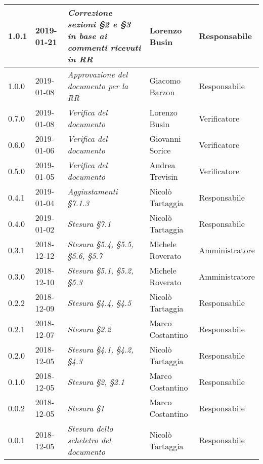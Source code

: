 \begin{longtable}{C{2cm}|C{2.5cm}|C{4.5cm}|C{2.5cm}|C{3cm}}
		1.0.1 & 2019-01-21 & \emph{Correzione sezioni §2 e §3 in base ai commenti ricevuti in RR} & Lorenzo Busin & Responsabile \\
		\hline

		1.0.0 & 2019-01-08 & \emph{Approvazione del documento per la RR} & Giacomo Barzon & Responsabile \\
		\hline

		0.7.0 & 2019-01-08 & \emph{Verifica del documento} & Lorenzo Busin & Verificatore \\
		\hline

		0.6.0 & 2019-01-06 & \emph{Verifica del documento} & Giovanni Sorice & Verificatore \\
		\hline

		0.5.0 & 2019-01-05 & \emph{Verifica del documento} & Andrea Trevisin & Verificatore \\
		\hline

		0.4.1 & 2019-01-04 & \emph{Aggiustamenti §7.1.3} & Nicolò Tartaggia & Responsabile \\
		\hline

		0.4.0 & 2019-01-02 & \emph{Stesura §7.1} & Nicolò Tartaggia & Responsabile \\
		\hline

		0.3.1 & 2018-12-12 & \emph{Stesura §5.4, §5.5, §5.6, §5.7} & Michele Roverato & Amministratore \\
		\hline

		0.3.0 & 2018-12-10 & \emph{Stesura §5.1, §5.2, §5.3} & Michele Roverato & Amministratore \\
		\hline

		0.2.2 & 2018-12-09 & \emph{Stesura §4.4, §4.5} & Nicolò Tartaggia & Responsabile \\
		\hline

		0.2.1 & 2018-12-07 & \emph{Stesura §2.2} & Marco Costantino & Responsabile \\
		\hline

		0.2.0 & 2018-12-05 & \emph{Stesura §4.1, §4.2, §4.3} & Nicolò Tartaggia & Responsabile \\
		\hline

		0.1.0 & 2018-12-05 & \emph{\textit{Stesura §2, §2.1}} & Marco Costantino & Responsabile \\
		\hline

		0.0.2 & 2018-12-05 & \emph{Stesura §1} & Marco Costantino & Responsabile \\
		\hline

		0.0.1 & 2018-12-05 & \emph{Stesura dello scheletro del documento} & Nicolò Tartaggia & Responsabile \\

	\end{longtable}

\clearpage
